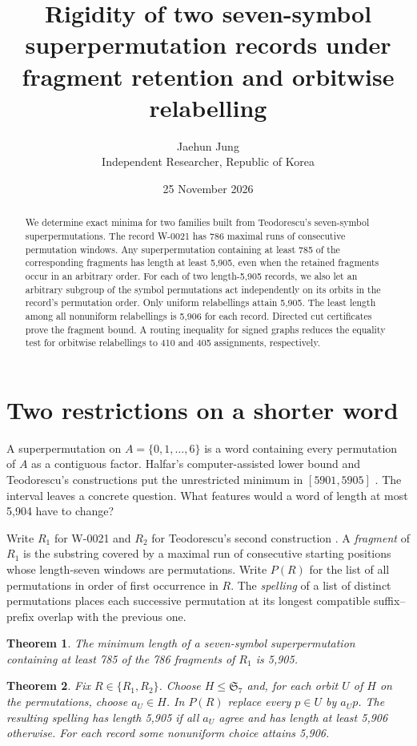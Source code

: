 \documentclass[11pt]{article}
\title{Rigidity of two seven-symbol superpermutation records under fragment retention and orbitwise relabelling}
\author{Jaehun Jung\\[3pt]{\small Independent Researcher, Republic of Korea}}
\date{25 November 2026}
\newtheorem{theorem}{Theorem}
\newcommand{\Sym}{\mathfrak S_7}
\begin{document}
\maketitle
\begin{abstract}
We determine exact minima for two families built from Teodorescu's seven-symbol superpermutations. The record W-0021 has 786 maximal runs of consecutive permutation windows. Any superpermutation containing at least 785 of the corresponding fragments has length at least 5,905, even when the retained fragments occur in an arbitrary order. For each of two length-5,905 records, we also let an arbitrary subgroup of the symbol permutations act independently on its orbits in the record's permutation order. Only uniform relabellings attain 5,905. The least length among all nonuniform relabellings is 5,906 for each record. Directed cut certificates prove the fragment bound. A routing inequality for signed graphs reduces the equality test for orbitwise relabellings to 410 and 405 assignments, respectively.
\end{abstract}
\section{Two restrictions on a shorter word}
A superpermutation on $A=\{0,1,\dots,6\}$ is a word containing every permutation of $A$ as a contiguous factor. Halfar's computer-assisted lower bound and Teodorescu's constructions put the unrestricted minimum in $[5901,5905]$ \cite{halfar,words,second}. The interval leaves a concrete question. What features would a word of length at most 5,904 have to change?

Write $R_1$ for W-0021 and $R_2$ for Teodorescu's second construction \cite{words,second}. A \emph{fragment} of $R_1$ is the substring covered by a maximal run of consecutive starting positions whose length-seven windows are permutations. Write $P(R)$ for the list of all permutations in order of first occurrence in $R$. The \emph{spelling} of a list of distinct permutations places each successive permutation at its longest compatible suffix--prefix overlap with the previous one.
\begin{theorem}\label{thm:frag}
The minimum length of a seven-symbol superpermutation containing at least 785 of the 786 fragments of $R_1$ is 5,905.
\end{theorem}
\begin{theorem}\label{thm:orbit}
Fix $R\in\{R_1,R_2\}$. Choose $H\leq\Sym$ and, for each orbit $U$ of $H$ on the permutations, choose $a_U\in H$. In $P(R)$ replace every $p\in U$ by $a_Up$. The resulting spelling has length 5,905 if all $a_U$ agree and has length at least 5,906 otherwise. For each record some nonuniform choice attains 5,906.
\end{theorem}
\newpage
\end{document}
